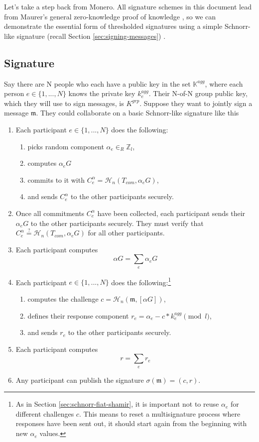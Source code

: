 Let's take a step back from Monero. All signature schemes in this document lead from Maurer's general zero-knowledge proof of knowledge \cite{simple-zk-proof-maurer}, so we can demonstrate the essential form of thresholded signatures using a simple Schnorr-like signature (recall Section \ref{sec:signing-messages}) \cite{old-multisig-mrl-note}.


\subsection*{Signature}

Say there are N people who each have a public key in the set $\mathbb{K}^{agg}$, where each person $e \in \{1,...,N\}$ knows the private key $k^{agg}_e$. Their N-of-N group public key, which they will use to sign messages, is $K^{grp}$. Suppose they want to jointly sign a message $\mathfrak{m}$. They could collaborate on a basic Schnorr-like signature like this
\begin{enumerate}
    \item Each participant $e \in \{1,...,N\}$ does the following:
    \begin{enumerate}
        \item picks random component $\alpha_e \in_R \mathbb{Z}_l$,
        \item computes $\alpha_e G$
        \item commits to it with $C^{\alpha}_e = \mathcal{H}_n(T_{com},\alpha_e G)$,
        \item and sends $C^{\alpha}_e$ to the other participants securely.
    \end{enumerate}
    \item Once all commitments $C^{\alpha}_e$ have been collected, each participant sends their $\alpha_e G$ to the other participants securely. They must verify that $C^{\alpha}_e \stackrel{?}{=} \mathcal{H}_n(T_{com},\alpha_e G)$ for all other participants.
    \item Each participant computes
    \[ \alpha G = \sum_e \alpha_e G \]
    \item Each participant $e \in \{1,...,N\}$ does the following:\footnote{As in Section \ref{sec:schnorr-fiat-shamir}, it is important not to reuse $\alpha_e$ for different challenges $c$. This means to reset a multisignature process where responses have been sent out, it should start again from the beginning with new $\alpha_e$ values.}
    \begin{enumerate}
        \item computes the challenge $c = \mathcal{H}_n(\mathfrak{m},[\alpha G])$,
        \item defines their response component $r_e = \alpha_e - c* k^{agg}_e \pmod l$,
        \item and sends $r_e$ to the other participants securely.
    \end{enumerate}
    \item Each participant computes
    \[ r = \sum_e r_e\]
    \item Any participant can publish the signature $\sigma(\mathfrak{m}) = (c,r)$.
\end{enumerate}


